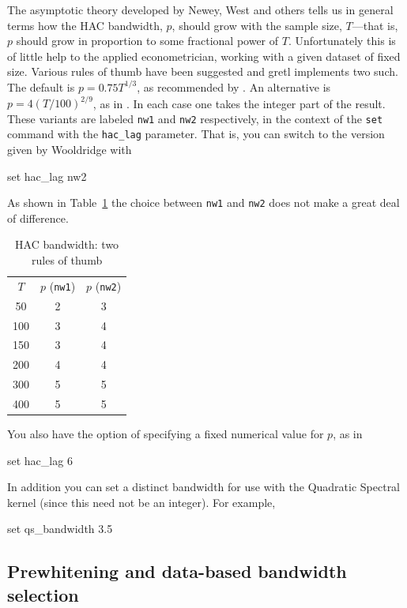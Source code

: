 The asymptotic theory developed by Newey, West and others tells us in
general terms how the HAC bandwidth, $p$, should grow with the sample
size, $T$---that is, $p$ should grow in proportion to some
fractional power of $T$.  Unfortunately this is of little help to the
applied econometrician, working with a given dataset of fixed size.
Various rules of thumb have been suggested and gretl implements
two such.  The default is $p = 0.75 T^{1/3}$, as recommended by
\cite{stock-watson03}.  An alternative is $p = 4(T/100)^{2/9}$, as in
\cite{wooldridge-intro}.  In each case one takes the integer part of the
result.  These variants are labeled \texttt{nw1} and \texttt{nw2}
respectively, in the context of the \texttt{set} command with the
\verb|hac_lag| parameter.  That is, you can switch to the version
given by Wooldridge with
%
\begin{code}
set hac_lag nw2
\end{code}
%
As shown in Table~\ref{tab:haclag} the choice between \texttt{nw1} and
\texttt{nw2} does not make a great deal of difference.

\begin{table}[htbp]
  \centering
  \begin{tabular}{ccc}
    $T$ & $p$ (\texttt{nw1}) & $p$ (\texttt{nw2}) \\[4pt]
50& 	2& 	3 \\
100& 	3& 	4 \\
150& 	3& 	4 \\
200& 	4& 	4 \\
300& 	5& 	5 \\
400& 	5& 	5 \\
  \end{tabular}
\caption{HAC bandwidth: two rules of thumb}
\label{tab:haclag}
\end{table}

You also have the option of specifying a fixed numerical value for
$p$, as in
%
\begin{code}
set hac_lag 6
\end{code}
%
In addition you can set a distinct bandwidth for use with the
Quadratic Spectral kernel (since this need not be an integer).  For
example,
%
\begin{code}
set qs_bandwidth 3.5
\end{code}

\subsection{Prewhitening and data-based bandwidth selection}
\label{sec:hac-prewhiten}

